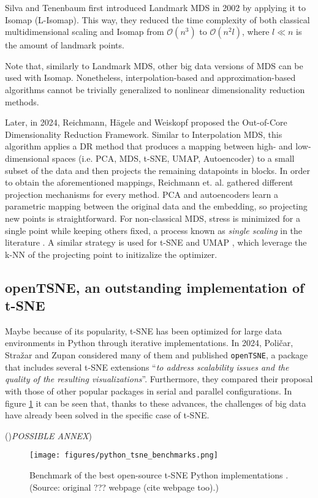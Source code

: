 Silva and Tenenbaum \cite{deSilvaTenenbaum2002} first introduced Landmark MDS in 2002 by applying it to Isomap (L-Isomap). This way, they reduced the time complexity of both classical multidimensional scaling and Isomap from $\mathcal{O}(n^3)$ to $\mathcal{O}(n^2l)$, where $l \ll n$ is the amount of landmark points.

Note that, similarly to Landmark MDS, other big data versions of MDS can be used with Isomap. Nonetheless, interpolation-based and approximation-based algorithms cannot be trivially generalized to nonlinear dimensionality reduction methods.

Later, in 2024, Reichmann, Hägele and Weiskopf \cite{reichmann2024outofcoredimensionalityreductionlarge} proposed the Out-of-Core Dimensionality Reduction Framework. Similar to Interpolation MDS, this algorithm applies a DR method that produces a mapping between high- and low-dimensional spaces (i.e. PCA, MDS, t-SNE, UMAP, Autoencoder) to a small subset of the data and then projects the remaining datapoints in blocks. In order to obtain the aforementioned mappings, Reichmann et. al. gathered different projection mechanisms for every method. PCA and autoencoders learn a parametric mapping between the original data and the embedding, so projecting new points is straightforward. For non-classical MDS, stress is minimized for a single point while keeping others fixed, a process known as \textit{single scaling} in the literature \cite{single-scaling}. A similar strategy is used for t-SNE \cite{tsne-knn} and UMAP \cite{McInnes2018}, which leverage the k-NN of the projecting point to initizalize the optimizer.

\subsection{openTSNE, an outstanding implementation of t-SNE}

Maybe because of its popularity, t-SNE has been optimized for large data environments in Python through iterative implementations. In 2024, Poličar, Stražar and Zupan \cite{Policar2024} considered many of them and published \verb|openTSNE|, a package that includes several t-SNE extensions \enquote{\textit{to address scalability issues and the quality of the resulting visualizations}}. Furthermore, they compared their proposal with those of other popular packages in serial and parallel configurations. In figure \ref{fig:python_tsne_benchmarks} it can be seen that, thanks to these advances, the challenges of big data have already been solved in the specific case of t-SNE.

()\textit{POSSIBLE ANNEX})

\begin{figure}[ht]
    \centering
    \texttt{[image: figures/python\_tsne\_benchmarks.png]}
    \caption{Benchmark of the best open-source t-SNE Python implementations \cite{Policar2024}. (Source: original ??? webpage (cite webpage too).)}
    \label{fig:python_tsne_benchmarks}
\end{figure}